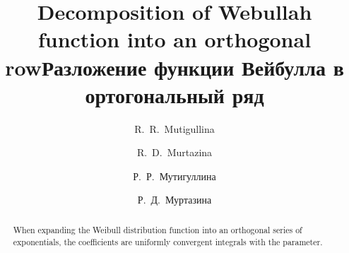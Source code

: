 \begin{englishtitle} %
\title{Decomposition of Webullah function into an orthogonal row}
\author{R.~R.~Mutigullina  \and  R.~D.~Murtazina
 }

\maketitle

\begin{abstract}
When expanding the Weibull distribution function into an orthogonal series of exponentials, the coefficients are uniformly convergent integrals with the parameter.

\end{abstract}
\end{englishtitle}


\iffalse
%
%

\documentclass[12pt]{llncs}  


\usepackage{iftex}

\ifPDFTeX
\usepackage[T2A]{fontenc}
\usepackage[utf8]{inputenc} %
\usepackage[english,russian]{babel}
\fi

\usepackage{todonotes} 

\usepackage[russian]{nla}


\fi

\title{Разложение функции Вейбулла в ортогональный ряд}
\author{Р.~Р.~Мутигуллина  \and Р.~Д.~Муртазина
 } %


